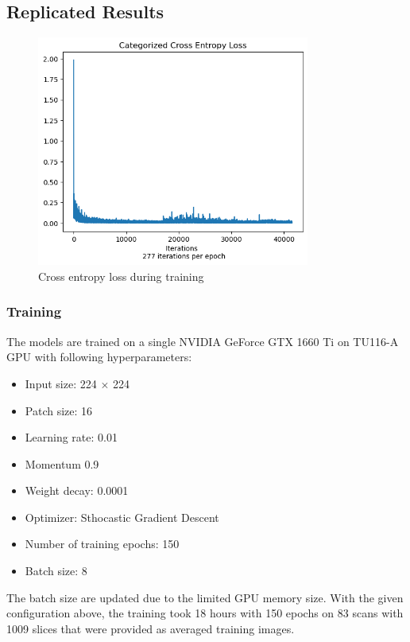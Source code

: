 \documentclass{IEEEtran}
\begin{document}
\subsection{Replicated Results}

\begin{figure}[h]
\centering
\includegraphics[width=0.8\textwidth]{img/celoss.png}
\caption{Cross entropy loss during training}\label{fig:celoss}
\end{figure}

\subsubsection{Training}
The models are trained on a single NVIDIA GeForce GTX 1660 Ti on TU116-A GPU
with following hyperparameters:
\begin{itemize}
    \item Input size: 224 $\times$ 224
    \item Patch size: 16
    \item Learning rate: 0.01
    \item Momentum 0.9 
    \item Weight decay: 0.0001
    \item Optimizer: Sthocastic Gradient Descent
    \item Number of training epochs: 150
    \item Batch size: 8
\end{itemize} 
The batch size are updated due to the limited GPU memory size. With the given configuration above, the training took 18 hours with 150 epochs on 83 scans with 1009 slices that were provided as averaged training images. 
\end{document}
